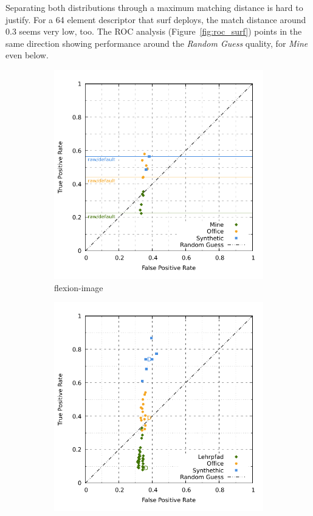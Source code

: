 Separating both distributions through a maximum matching distance is hard to justify.
For a 64 element descriptor that \acrshort{surf} deploys, the match distance around \num{0.3} seems very low, too.
The \acrshort{ROC} analysis (Figure~\ref{fig:roc_surf}) points in the same direction showing performance around the \emph{Random Guess} quality, for \emph{Mine} even below.
\begin{figure}[b!]
\begin{subfigure}[t]{0.45\linewidth}
    \includegraphics[width=\linewidth]{chapter06/results/SURF/flexion/roc.pdf}%
    \caption{\gls{flexion-image}}
\end{subfigure}\quad
\begin{subfigure}[t]{0.45\linewidth}
    \includegraphics[width=\linewidth]{chapter06/results/SURF/bearing/roc.pdf}

\end{subfigure}
\end{figure}
